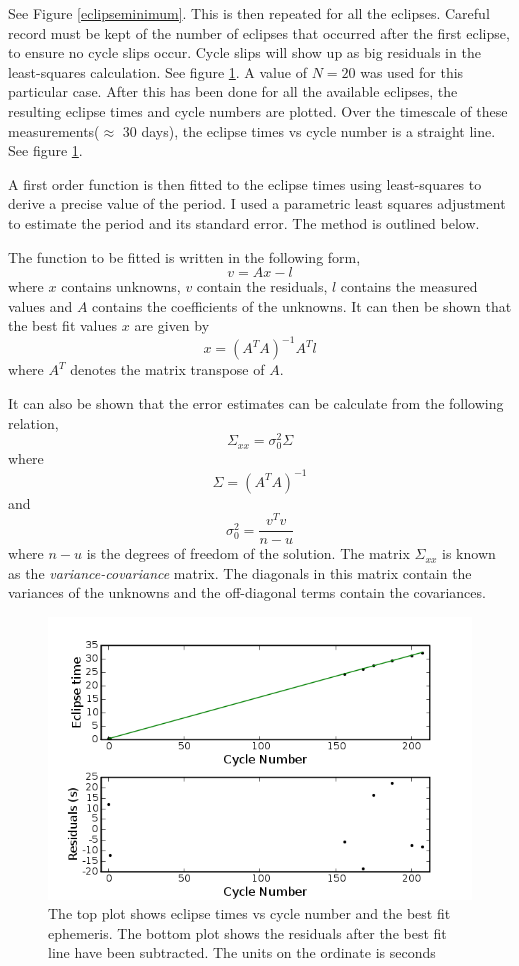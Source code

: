 See Figure \ref{eclipseminimum}. This is then repeated for all the eclipses. Careful record must be kept of the number of eclipses that occurred after the first eclipse, to ensure no cycle slips occur. Cycle slips will show up as big residuals in the least-squares calculation. See figure \ref{ephemeris}. A value of $N=20$ was used for this particular case. After this has been done for all the available eclipses, the resulting eclipse times and cycle numbers are plotted. Over the timescale of these measurements($\approx$ 30 days), the eclipse times vs cycle number is a straight line. See figure \ref{ephemeris}.

A first order function is then fitted to the eclipse times using least-squares to derive a precise value of the period. I used a parametric least squares adjustment to estimate the period and its standard error. The method is outlined below.

The function to be fitted is written in the following form, $$  v = Ax - l $$ where $x$ contains unknowns, $v$ contain the residuals, $l$ contains the measured values and $A$ contains the coefficients of the unknowns. It can then be shown that the best fit values $x$ are given by $$ x = (A^{T}A)^{-1}A^{T}l $$ where $A^{T}$ denotes the matrix transpose of $A$. 

It can also be shown that the error estimates can be calculate from the following relation, $$ \Sigma_{xx} = \sigma^{2}_{0} \Sigma $$ where $$ \Sigma = (A^{T}A)^{-1} $$ and $$ \sigma^{2}_{0} = \frac{v^{T}v}{n-u} $$ where $n-u$ is the degrees of freedom of the solution. The matrix $ \Sigma_{xx} $ is known as the \textit{variance-covariance} matrix. The diagonals in this matrix contain the variances of the unknowns and the off-diagonal terms contain the covariances.


\begin{figure}
\begin{center}
\includegraphics[width=0.85\columnwidth,bb=0 0 600 400]{images/ephemeris.png}
\caption[Plot of Eclipse times versus cycle number]{The top plot shows eclipse times vs cycle number and the best fit ephemeris. The bottom plot shows the residuals after the best fit line have been subtracted. The units on the ordinate is seconds}
\label{ephemeris}
\end{center}
\end{figure}


